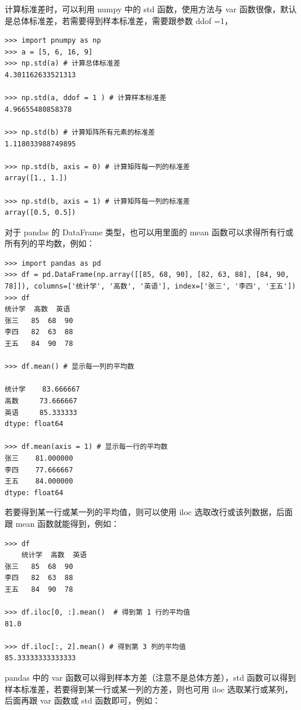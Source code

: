 计算标准差时，可以利用 numpy 中的 std 函数，使用方法与 var 函数很像，默认是总体标准差，若需要得到样本标准差，需要跟参数 ddof =1，

\begin{lstlisting}[Language=Python]
>>> import pnumpy as np
>>> a = [5, 6, 16, 9]
>>> np.std(a) # 计算总体标准差
4.301162633521313

>>> np.std(a, ddof = 1 ) # 计算样本标准差
4.96655480858378

>>> np.std(b) # 计算矩阵所有元素的标准差
1.118033988749895

>>> np.std(b, axis = 0) # 计算矩阵每一列的标准差
array([1., 1.])

>>> np.std(b, axis = 1) # 计算矩阵每一列的标准差
array([0.5, 0.5])

\end{lstlisting}



对于 pandas 的 DataFrame 类型，也可以用里面的 mean 函数可以求得所有行或所有列的平均数，例如：

\begin{lstlisting}[Language=Python]
>>> import pandas as pd
>>> df = pd.DataFrame(np.array([[85, 68, 90], [82, 63, 88], [84, 90, 78]]), columns=['统计学', '高数', '英语'], index=['张三', '李四', '王五'])
>>> df
统计学  高数  英语
张三   85  68  90
李四   82  63  88
王五   84  90  78

>>> df.mean() # 显示每一列的平均数

统计学    83.666667
高数     73.666667
英语     85.333333
dtype: float64

>>> df.mean(axis = 1) # 显示每一行的平均数
张三    81.000000
李四    77.666667
王五    84.000000
dtype: float64
\end{lstlisting}

若要得到某一行或某一列的平均值，则可以使用 iloc 选取改行或该列数据，后面跟 mean 函数就能得到，例如：

\begin{lstlisting}[Language=Python]
>>> df
    统计学  高数  英语
张三   85  68  90
李四   82  63  88
王五   84  90  78

>>> df.iloc[0, :].mean()  # 得到第 1 行的平均值
81.0

>>> df.iloc[:, 2].mean() # 得到第 3 列的平均值
85.33333333333333

\end{lstlisting}

pandas 中的 var 函数可以得到样本方差（注意不是总体方差），std 函数可以得到样本标准差，若要得到某一行或某一列的方差，则也可用 iloc 选取某行或某列，后面再跟 var 函数或 std 函数即可，例如：

